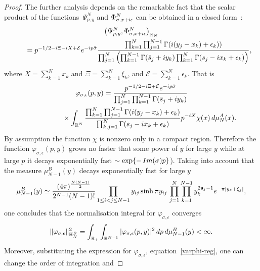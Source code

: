 \documentclass[11pt]{article}
\numberwithin{equation}{section}
\numberwithin{equation}{section}
\begin{document}
\begin{proof}
The further analysis depends on the remarkable fact that the scalar product of the func\-ti\-ons~$\Psi^N_{p,y}$ and
$\Phi^N_{\sigma,x+{\rm i}\epsilon}$ can be obtained in a closed form~\cite{Belitsky:2014rba}:
\begin{gather}
\big(\Psi^N_{p, y},\Phi^N_{\sigma,x+{\rm i}\epsilon}\big)_{\mathbb H_N} \nonumber
\\ \qquad
{}=p^{-1/2 -{\rm i}\Xi-{\rm i}X+\mathcal E}{\rm e}^{-{\rm i}p\bar\sigma}\frac{
\prod_{k=1}^N\prod_{j=1}^{N-1} \Gamma({\rm i}(y_j-x_k)+\epsilon_k))
}{\prod_{j=1}^N\left(\prod_{k=1}^{N-1}\Gamma( \bar s_j+{\rm i}y_k)\prod_{k=1}^{N}\Gamma( s_j-{\rm i}x_k+\epsilon_k)\right)},\label{BtoA}
\end{gather}
where $X=\sum_{k=1}^N x_k$ and $\Xi=\sum_{k=1}^N \xi_k$, and $\mathcal E=\sum_{k=1}^N \epsilon_k$. That is
\begin{gather}
\varphi_{\sigma,\epsilon}(p,y)=\frac{p^{-1/2 -{\rm i}\Xi+\mathcal E}{\rm e}^{-{\rm i}p\bar\sigma}}{\prod_{j=1}^N\prod_{k=1}^{N-1}\Gamma( \bar s_j+{\rm i}y_k)}\nonumber
\\ \hphantom{\varphi_{\sigma,\epsilon}(p,y)=}
{}\times\int_{\mathbb R^N}\frac{
\prod_{k=1}^N\prod_{j=1}^{N-1} \Gamma({\rm i}(y_j-x_k)+\epsilon_k)}{\prod_{k,j=1}^{N}\Gamma( s_j-{\rm i}x_k+\epsilon_k)}
 p^{-{\rm i}X} \chi(x)\,{\rm d}\mu_N^A(x). \label{varphi-reg}
\end{gather}
By assumption the function $\chi$ is nonzero only in a compact region. Therefore the function $\varphi_{\sigma,\epsilon}(p,y)$ grows no
faster that some power of $y$ for large $y$ while at large $p$ it decays exponentially fast $\sim \exp\{-\mathop{\rm Im}(\sigma)p\}$). Taking
into account that the measure $\mu_{N-1}^{B}(y)$ decays exponentially fast for large $y$
\begin{gather*}
\mu^B_{N-1}(y) \simeq \frac{(4\pi)^{\frac{N(N-1)}2} }{2^{N-1} (N-1)!}
\prod_{1\leq i<j\leq N-1} {y_{ij}}\sinh\pi y_{ij}\, \prod_{j=1}^N\prod_{k=1}^{N-1} y_k^{2\boldsymbol s_j-1} {\rm e}^{-\pi |y_k+\xi_j|},
\end{gather*}
one concludes that the normalisation integral for $\varphi_{\sigma,\epsilon}$ converges
\begin{gather*}
\|\varphi_{\sigma,\epsilon}\|^2_{\mathbb H_N^B}=\int_{\mathbb R_+}\int_{\mathbb R^{N-1}}
 |\varphi_{\sigma,\epsilon}(p,y)|^2 \,{\rm d}p \,{\rm d}\mu_{N-1}^{B}(y) < \infty.
\end{gather*}
Moreover, substituting the expression for $\varphi_{\sigma,\epsilon}$, equation~\eqref{varphi-reg}, one can change the order of integration and

\end{proof}
\end{document}
